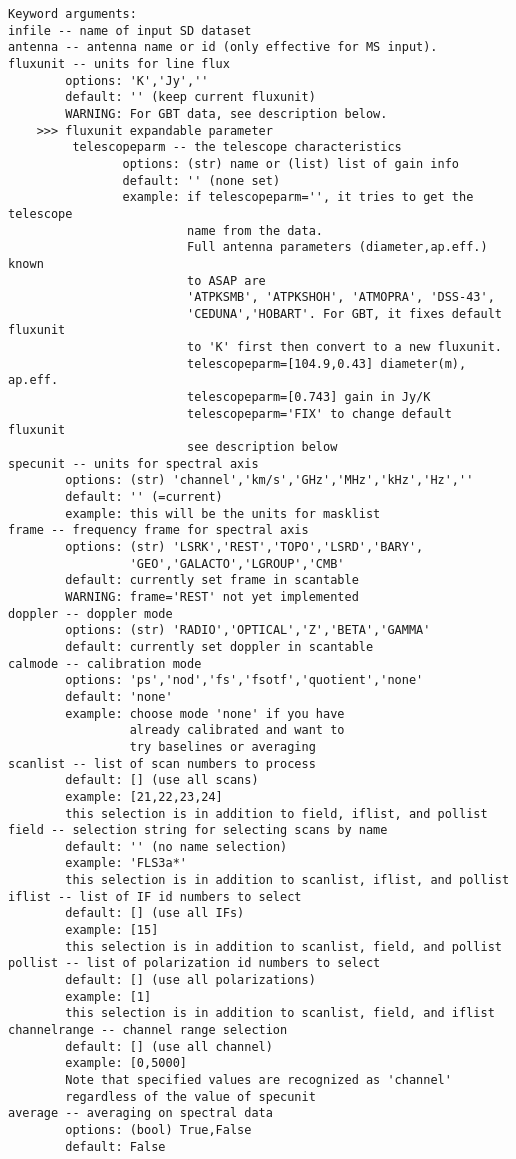 \begin{verbatim}
Keyword arguments:
infile -- name of input SD dataset
antenna -- antenna name or id (only effective for MS input). 
fluxunit -- units for line flux
        options: 'K','Jy',''
        default: '' (keep current fluxunit)
        WARNING: For GBT data, see description below.
    >>> fluxunit expandable parameter
         telescopeparm -- the telescope characteristics
                options: (str) name or (list) list of gain info
                default: '' (none set)
                example: if telescopeparm='', it tries to get the telescope
                         name from the data.
                         Full antenna parameters (diameter,ap.eff.) known
                         to ASAP are
                         'ATPKSMB', 'ATPKSHOH', 'ATMOPRA', 'DSS-43',
                         'CEDUNA','HOBART'. For GBT, it fixes default fluxunit
                         to 'K' first then convert to a new fluxunit.
                         telescopeparm=[104.9,0.43] diameter(m), ap.eff.
                         telescopeparm=[0.743] gain in Jy/K
                         telescopeparm='FIX' to change default fluxunit
                         see description below
specunit -- units for spectral axis
        options: (str) 'channel','km/s','GHz','MHz','kHz','Hz',''
        default: '' (=current)
        example: this will be the units for masklist
frame -- frequency frame for spectral axis
        options: (str) 'LSRK','REST','TOPO','LSRD','BARY',
                 'GEO','GALACTO','LGROUP','CMB'
        default: currently set frame in scantable
        WARNING: frame='REST' not yet implemented
doppler -- doppler mode
        options: (str) 'RADIO','OPTICAL','Z','BETA','GAMMA'
        default: currently set doppler in scantable
calmode -- calibration mode
        options: 'ps','nod','fs','fsotf','quotient','none'
        default: 'none'
        example: choose mode 'none' if you have
                 already calibrated and want to
                 try baselines or averaging
scanlist -- list of scan numbers to process
        default: [] (use all scans)
        example: [21,22,23,24]
        this selection is in addition to field, iflist, and pollist
field -- selection string for selecting scans by name
        default: '' (no name selection)
        example: 'FLS3a*'
        this selection is in addition to scanlist, iflist, and pollist
iflist -- list of IF id numbers to select
        default: [] (use all IFs)
        example: [15]
        this selection is in addition to scanlist, field, and pollist
pollist -- list of polarization id numbers to select
        default: [] (use all polarizations)
        example: [1]
        this selection is in addition to scanlist, field, and iflist
channelrange -- channel range selection
        default: [] (use all channel)
        example: [0,5000]
        Note that specified values are recognized as 'channel' 
        regardless of the value of specunit 
average -- averaging on spectral data 
        options: (bool) True,False
        default: False


\end{verbatim}
